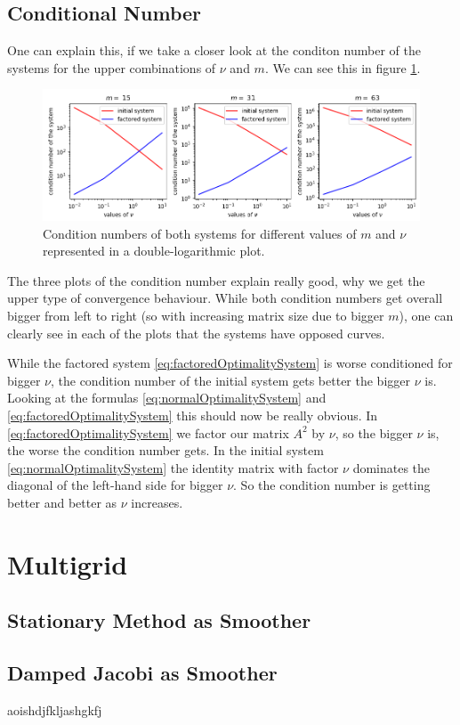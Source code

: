\documentclass{amsart}
\theoremstyle{definition}
\theoremstyle{remark}
\numberwithin{equation}{section}
\begin{document}
\subsection{Conditional Number}
One can explain this, if we take a closer look at the conditon number of the systems for the upper combinations of $\nu$ and $m$. We can see this in 
figure \ref{fig:CG-conditionNumber}.
\begin{figure}[h!]
\centering
\includegraphics[scale=0.65]{./imgs/CG_conditionNumber}
\caption{Condition numbers of both systems for different values of $m$ and $\nu$ represented in a double-logarithmic plot.}
\label{fig:CG-conditionNumber}
\end{figure}
The three plots of the condition number explain really good, why we get the upper type of convergence behaviour. While both condition numbers get overall
bigger from left to right (so with increasing matrix size due to bigger $m$), one can clearly see in each of the plots that the systems have opposed 
curves.

While the factored system \eqref{eq:factoredOptimalitySystem} is worse conditioned for bigger $\nu$, the condition number of the initial system 
gets better the bigger $\nu$ is. Looking at the formulas \eqref{eq:normalOptimalitySystem} and \eqref{eq:factoredOptimalitySystem} this should now be 
really obvious.
In \eqref{eq:factoredOptimalitySystem} we factor our matrix $A^2$ by $\nu$, so the bigger $\nu$ is, the worse the condition number gets. In the initial 
system \eqref{eq:normalOptimalitySystem} the identity matrix with factor $\nu$ dominates the diagonal of the left-hand side for bigger $\nu$. So the 
condition number is getting better and better as $\nu$ increases.






\section{Multigrid}


\subsection{Stationary Method as Smoother}


\subsection{Damped Jacobi as Smoother}
aoishdjfkljashgkfj
\end{document}
